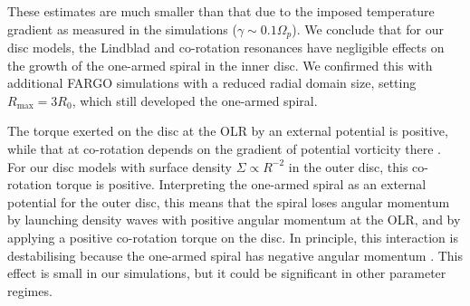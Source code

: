 These estimates are much smaller than that due to
the imposed temperature gradient as measured in the simulations
($\gamma\sim 0.1\Omega_p$). We conclude that for our disc models, the
Lindblad and co-rotation resonances have negligible effects on the
growth of the one-armed spiral in the inner disc. We confirmed this with
additional FARGO simulations with a reduced radial domain size,
setting $R_\mathrm{max}=3R_0$, which still developed the one-armed
spiral. 

The torque exerted on the disc at the OLR by an
external potential is positive, while that at co-rotation 
depends on the gradient of potential vorticity there
\citep{goldreich79}. For our disc models with surface density
$\Sigma\propto R^{-2}$ in the outer disc, this co-rotation torque is
positive. Interpreting the one-armed spiral as an external potential
for the outer disc, this means that the spiral loses
angular momentum by launching density waves with positive angular momentum at
the OLR, and by applying a positive co-rotation torque on the disc. 
In principle, this interaction is destabilising because the
one-armed spiral has negative angular momentum
\citep{lin11b}. This effect is small in our simulations, but it  
could be significant in other parameter regimes. %

